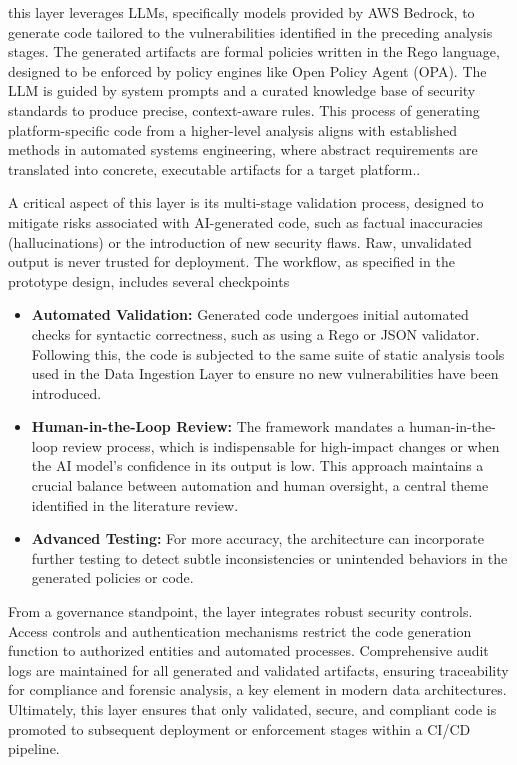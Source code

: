 this layer leverages LLMs, specifically models provided by AWS Bedrock, to generate code tailored to the vulnerabilities identified in the preceding analysis stages. The generated artifacts are formal policies written in the Rego language, designed to be enforced by policy engines like Open Policy Agent (OPA). The LLM is guided by system prompts and a curated knowledge base of security standards to produce precise, context-aware rules. This process of generating platform-specific code from a higher-level analysis aligns with established methods in automated systems engineering, where abstract requirements are translated into concrete, executable artifacts for a target platform.\cite{chen_platform-specific_2025}.

A critical aspect of this layer is its multi-stage validation process, designed to mitigate risks associated with AI-generated code, such as factual inaccuracies (hallucinations) or the introduction of new security flaws\cite{kumar_generative_nodate}. Raw, unvalidated output is never trusted for deployment. The workflow, as specified in the prototype design, includes several checkpoints

\begin{itemize}
    \item \textbf{Automated Validation:} Generated code undergoes initial automated checks for syntactic correctness, such as using a Rego or JSON validator. Following this, the code is subjected to the same suite of static analysis tools used in the Data Ingestion Layer to ensure no new vulnerabilities have been introduced.
    \item \textbf{Human-in-the-Loop Review:} The framework mandates a human-in-the-loop review process, which is indispensable for high-impact changes or when the AI model's confidence in its output is low. This approach maintains a crucial balance between automation and human oversight, a central theme identified in the literature review.
    \item \textbf{Advanced Testing:} For more accuracy, the architecture can incorporate further testing to detect subtle inconsistencies or unintended behaviors in the generated policies or code.
\end{itemize}

From a governance standpoint, the layer integrates robust security controls. Access controls and authentication mechanisms restrict the code generation function to authorized entities and automated processes. Comprehensive audit logs are maintained for all generated and validated artifacts, ensuring traceability for compliance and forensic analysis, a key element in modern data architectures\cite{ismail_big_2025-1}. Ultimately, this layer ensures that only validated, secure, and compliant code is promoted to subsequent deployment or enforcement stages within a CI/CD pipeline.

